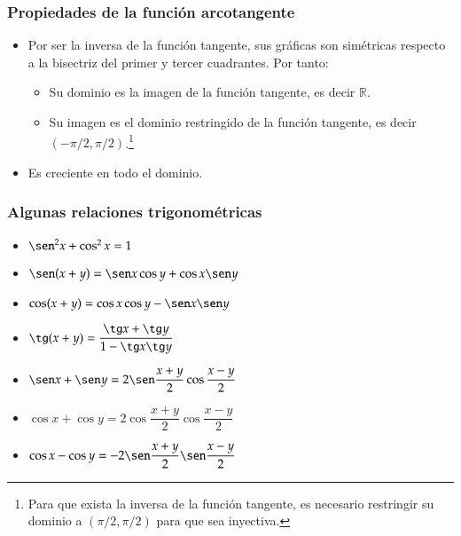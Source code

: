\begin{frame}
\frametitle{Propiedades de la función arcotangente}
\begin{itemize}
\item Por ser la inversa de la función tangente, sus gráficas son simétricas respecto a la bisectriz del primer y tercer cuadrantes. Por tanto:
\begin{itemize}
\item Su dominio es la imagen de la función tangente, es decir $\mathbb{R}$.
\item Su imagen es el dominio restringido de la función tangente, es decir $(-\pi/2,\pi/2)$.\footnote{Para que exista la inversa de la función tangente, es necesario restringir su dominio a $(\pi/2,\pi/2)$ para que sea inyectiva.}
\end{itemize}
\item Es creciente en todo el dominio.
\end{itemize}
\end{frame} 


\begin{frame}
\frametitle{Algunas relaciones trigonométricas}
\begin{itemize}
\item $\sen^2 x+\cos^2 x=1$
\item $\sen(x+y)=\sen x \cos y+\cos x \sen y$
\item $\cos(x+y)=\cos x \cos y-\sen x \sen y$
\item $\tg (x+y)= \dfrac{\tg x+\tg y}{1-\tg x \tg y}$
\item $\sen x + \sen y = 2 \sen \dfrac{x+y}{2}\cos\dfrac{x-y}{2}$
\item $\cos x + \cos y = 2 \cos \dfrac{x+y}{2}\cos\dfrac{x-y}{2}$
\item $\cos x - \cos y = -2 \sen \dfrac{x+y}{2}\sen\dfrac{x-y}{2}$
\end{itemize}
\end{frame} 